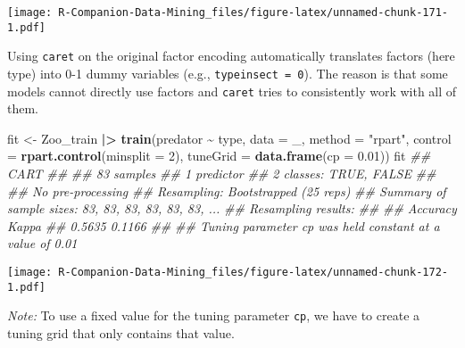 \documentclass[
  notitlepage]{book}
\newenvironment{Shaded}{\begin{snugshade}}{\end{snugshade}}
\newcommand{\CommentTok}[1]{\textcolor[rgb]{0.56,0.35,0.01}{\textit{#1}}}
\newcommand{\DataTypeTok}[1]{\textcolor[rgb]{0.13,0.29,0.53}{#1}}
\newcommand{\DecValTok}[1]{\textcolor[rgb]{0.00,0.00,0.81}{#1}}
\newcommand{\ErrorTok}[1]{\textcolor[rgb]{0.64,0.00,0.00}{\textbf{#1}}}
\newcommand{\FloatTok}[1]{\textcolor[rgb]{0.00,0.00,0.81}{#1}}
\newcommand{\KeywordTok}[1]{\textcolor[rgb]{0.13,0.29,0.53}{\textbf{#1}}}
\newcommand{\NormalTok}[1]{#1}
\newcommand{\OperatorTok}[1]{\textcolor[rgb]{0.81,0.36,0.00}{\textbf{#1}}}
\newcommand{\StringTok}[1]{\textcolor[rgb]{0.31,0.60,0.02}{#1}}
\begin{document}
\texttt{[image: R-Companion-Data-Mining\_files/figure-latex/unnamed-chunk-171-1.pdf]}

Using \texttt{caret} on the original factor encoding automatically translates
factors (here type) into 0-1 dummy variables (e.g., \texttt{typeinsect\ =\ 0}).
The reason is that some models cannot directly use factors and \texttt{caret}
tries to consistently work with all of them.

\begin{Shaded}
\begin{Highlighting}[]
\NormalTok{fit \textless{}{-}}\StringTok{ }\NormalTok{Zoo\_train }\OperatorTok{|}\ErrorTok{\textgreater{}}\StringTok{ }
\StringTok{  }\KeywordTok{train}\NormalTok{(predator }\OperatorTok{\textasciitilde{}}\StringTok{ }\NormalTok{type, }
        \DataTypeTok{data =}\NormalTok{ \_, }
        \DataTypeTok{method =} \StringTok{"rpart"}\NormalTok{,}
        \DataTypeTok{control =} \KeywordTok{rpart.control}\NormalTok{(}\DataTypeTok{minsplit =} \DecValTok{2}\NormalTok{),}
        \DataTypeTok{tuneGrid =} \KeywordTok{data.frame}\NormalTok{(}\DataTypeTok{cp =} \FloatTok{0.01}\NormalTok{))}
\NormalTok{fit}
\CommentTok{\#\# CART }
\CommentTok{\#\# }
\CommentTok{\#\# 83 samples}
\CommentTok{\#\#  1 predictor}
\CommentTok{\#\#  2 classes: \textquotesingle{}TRUE\textquotesingle{}, \textquotesingle{}FALSE\textquotesingle{} }
\CommentTok{\#\# }
\CommentTok{\#\# No pre{-}processing}
\CommentTok{\#\# Resampling: Bootstrapped (25 reps) }
\CommentTok{\#\# Summary of sample sizes: 83, 83, 83, 83, 83, 83, ... }
\CommentTok{\#\# Resampling results:}
\CommentTok{\#\# }
\CommentTok{\#\#   Accuracy  Kappa }
\CommentTok{\#\#   0.5635    0.1166}
\CommentTok{\#\# }
\CommentTok{\#\# Tuning parameter \textquotesingle{}cp\textquotesingle{} was held constant at a value of 0.01}
\end{Highlighting}
\end{Shaded}

\begin{Shaded}
\end{Shaded}

\texttt{[image: R-Companion-Data-Mining\_files/figure-latex/unnamed-chunk-172-1.pdf]}

\emph{Note:} To use a fixed value for the tuning parameter \texttt{cp}, we have to
create a tuning grid that only contains that value.
\end{document}
